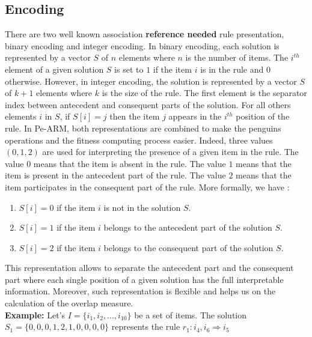 \documentclass[preprint,12pt]{elsarticle}
\begin{document}
\subsection{Encoding}
There are two well known association \textbf{reference needed} rule presentation, binary encoding and
integer encoding. In binary encoding, each solution is represented
by a vector $S$ of $n$ elements where $n$ is the number of items.
The $i^{th}$ element of a given solution $S$ is set to $1$ if the
item $i$ is in the rule and $0$ otherwise. However, in integer
encoding, the solution is represented by a vector $S$ of $k+1$
elements where $k$ is the size of the rule. The first element is
the separator index between antecedent and consequent parts of the
solution. For all others elements $i$ in $S$, if $S[i] = j$ then
the item $j$ appears in the $i^{th}$ position of the rule. In
Pe-ARM, both representations are combined to make the
penguins operations and the fitness computing process easier. Indeed, three
values $(0,1,2)$ are used for interpreting the presence of a given
item in the rule. The value $0$ means that the item is absent in
the rule. The value $1$ means that the item is present in the
antecedent part of the rule. The value $2$ means that the item
participates in the consequent part
of the rule. More formally, we have :
\begin{enumerate}
    \item $S[i] = 0$ if the item $i$ is not in the solution $S$.
    \item $S[i] = 1$ if the item $i$ belongs to the antecedent part of the solution $S$.
    \item $S[i] = 2$ if the item $i$ belongs to the consequent part of the solution $S$.
\end{enumerate}
This representation allows to separate the antecedent part and the
consequent part where each single position of a given solution has
the full interpretable information. Moreover, such representation
is flexible and helps us on the calculation of the overlap
measure.\\
\textbf{Example:} Let's $I=\{i_1, i_2,..., i_{10}\}$ be a set of items.
The solution $S_1=\{0, 0, 0, 1, 2, 1, 0, 0, 0, 0\}$ represents the
rule $r_1: i_4, i_6 \Rightarrow i_5$
\end{document}
